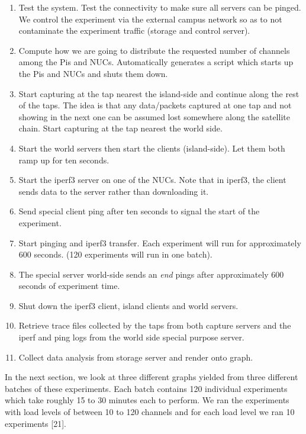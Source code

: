 \documentclass{uathesis}
\begin{document}
\begin{enumerate}

\item Test the system. Test the connectivity to make sure all servers can be pinged. We control the experiment via the external campus network so as to not contaminate the experiment traffic (storage and control server). 
\item Compute how we are going to distribute the requested number of channels among the Pis and NUCs. Automatically generates a script which starts up the Pis and NUCs and shuts them down.
\item Start capturing at the tap nearest the island-side and continue along the rest of the taps. The idea is that any data/packets captured at one tap and not showing in the next one can be assumed lost somewhere along the satellite chain. Start capturing at the tap nearest the world side. 
\item Start the world servers then start the clients (island-side). Let them both ramp up for ten seconds.
\item Start the iperf3 server on one of the NUCs. Note that in iperf3, the client sends data to the server rather than downloading it.
\item Send special client ping after ten seconds to signal the start of the experiment.
\item Start pinging and iperf3 transfer. Each experiment will run for approximately 600 seconds. (120 experiments will run in one batch).
\item  The special server world-side sends an \emph{end} pings after approximately 600 seconds of experiment time.
\item Shut down the iperf3 client, island clients and world servers.
\item Retrieve trace files collected by the taps from both capture servers and the iperf and ping logs from the world side special purpose server.
\item Collect data analysis from storage server and render onto graph.\\
\end{enumerate}

In the next section, we look at three different graphs yielded from three different batches of these experiments. Each batch contains 120 individual experiments which take roughly 15 to 30 minutes each to perform. We ran the experiments with load levels of between 10 to 120 channels and for each load level we ran 10 experiments [21]. \\
\end{document}
